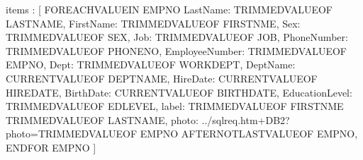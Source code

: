 \documentclass[letterpaper,10pt,english]{sphinxmanual}
\begin{document}
\begin{sphinxVerbatim}[commandchars=\\\{\}]
 \PYGZdq{}items\PYGZdq{} : [
 \PYGZob{}\PYGZob{}\PYGZob{}FOR\PYGZhy{}EACH\PYGZhy{}VALUE\PYGZhy{}IN \PYGZdq{}EMPNO\PYGZdq{}\PYGZcb{}\PYGZcb{}\PYGZcb{}
    \PYGZob{}\PYGZdq{}LastName\PYGZdq{}: \PYGZdq{}\PYGZob{}\PYGZob{}\PYGZob{}TRIMMED\PYGZhy{}VALUE\PYGZhy{}OF \PYGZdq{}LASTNAME\PYGZdq{}\PYGZcb{}\PYGZcb{}\PYGZcb{}\PYGZdq{},
    \PYGZdq{}FirstName\PYGZdq{}: \PYGZdq{}\PYGZob{}\PYGZob{}\PYGZob{}TRIMMED\PYGZhy{}VALUE\PYGZhy{}OF \PYGZdq{}FIRSTNME\PYGZdq{}\PYGZcb{}\PYGZcb{}\PYGZcb{}\PYGZdq{},
    \PYGZdq{}Sex\PYGZdq{}: \PYGZdq{}\PYGZob{}\PYGZob{}\PYGZob{}TRIMMED\PYGZhy{}VALUE\PYGZhy{}OF \PYGZdq{}SEX\PYGZdq{}\PYGZcb{}\PYGZcb{}\PYGZcb{}\PYGZdq{},
    \PYGZdq{}Job\PYGZdq{}: \PYGZdq{}\PYGZob{}\PYGZob{}\PYGZob{}TRIMMED\PYGZhy{}VALUE\PYGZhy{}OF \PYGZdq{}JOB\PYGZdq{}\PYGZcb{}\PYGZcb{}\PYGZcb{}\PYGZdq{},
    \PYGZdq{}PhoneNumber\PYGZdq{}: \PYGZdq{}\PYGZob{}\PYGZob{}\PYGZob{}TRIMMED\PYGZhy{}VALUE\PYGZhy{}OF \PYGZdq{}PHONENO\PYGZdq{}\PYGZcb{}\PYGZcb{}\PYGZcb{}\PYGZdq{},
    \PYGZdq{}EmployeeNumber\PYGZdq{}: \PYGZdq{}\PYGZob{}\PYGZob{}\PYGZob{}TRIMMED\PYGZhy{}VALUE\PYGZhy{}OF \PYGZdq{}EMPNO\PYGZdq{}\PYGZcb{}\PYGZcb{}\PYGZcb{}\PYGZdq{},
    \PYGZdq{}Dept\PYGZdq{}: \PYGZdq{}\PYGZob{}\PYGZob{}\PYGZob{}TRIMMED\PYGZhy{}VALUE\PYGZhy{}OF \PYGZdq{}WORKDEPT\PYGZdq{}\PYGZcb{}\PYGZcb{}\PYGZcb{}\PYGZdq{},
    \PYGZdq{}DeptName\PYGZdq{}: \PYGZdq{}\PYGZob{}\PYGZob{}\PYGZob{}CURRENT\PYGZhy{}VALUE\PYGZhy{}OF \PYGZdq{}DEPTNAME\PYGZdq{}\PYGZcb{}\PYGZcb{}\PYGZcb{}\PYGZdq{},
    \PYGZdq{}HireDate\PYGZdq{}: \PYGZdq{}\PYGZob{}\PYGZob{}\PYGZob{}CURRENT\PYGZhy{}VALUE\PYGZhy{}OF \PYGZdq{}HIREDATE\PYGZdq{}\PYGZcb{}\PYGZcb{}\PYGZcb{}\PYGZdq{},
    \PYGZdq{}BirthDate\PYGZdq{}: \PYGZdq{}\PYGZob{}\PYGZob{}\PYGZob{}CURRENT\PYGZhy{}VALUE\PYGZhy{}OF \PYGZdq{}BIRTHDATE\PYGZdq{}\PYGZcb{}\PYGZcb{}\PYGZcb{}\PYGZdq{},
    \PYGZdq{}EducationLevel\PYGZdq{}: \PYGZdq{}\PYGZob{}\PYGZob{}\PYGZob{}TRIMMED\PYGZhy{}VALUE\PYGZhy{}OF \PYGZdq{}EDLEVEL\PYGZdq{}\PYGZcb{}\PYGZcb{}\PYGZcb{}\PYGZdq{},
    \PYGZdq{}label\PYGZdq{}: \PYGZdq{}\PYGZob{}\PYGZob{}\PYGZob{}TRIMMED\PYGZhy{}VALUE\PYGZhy{}OF \PYGZdq{}FIRSTNME\PYGZdq{}\PYGZcb{}\PYGZcb{}\PYGZcb{} \PYGZob{}\PYGZob{}\PYGZob{}TRIMMED\PYGZhy{}VALUE\PYGZhy{}OF \PYGZdq{}LASTNAME\PYGZdq{}\PYGZcb{}\PYGZcb{}\PYGZcb{}\PYGZdq{},
    \PYGZdq{}photo\PYGZdq{}: \PYGZdq{}../sqlreq.htm+DB2?photo=\PYGZob{}\PYGZob{}\PYGZob{}TRIMMED\PYGZhy{}VALUE\PYGZhy{}OF \PYGZdq{}EMPNO\PYGZdq{}\PYGZcb{}\PYGZcb{}\PYGZcb{}\PYGZdq{}
 \PYGZcb{}\PYGZob{}\PYGZob{}\PYGZob{}AFTER\PYGZhy{}NOT\PYGZhy{}LAST\PYGZhy{}VALUE\PYGZhy{}OF \PYGZdq{}EMPNO\PYGZdq{},\PYGZcb{}\PYGZcb{}\PYGZcb{}
 \PYGZob{}\PYGZob{}\PYGZob{}END\PYGZhy{}FOR \PYGZdq{}EMPNO\PYGZdq{}\PYGZcb{}\PYGZcb{}\PYGZcb{}
 ]
\PYGZcb{}
\end{sphinxVerbatim}
\end{document}
